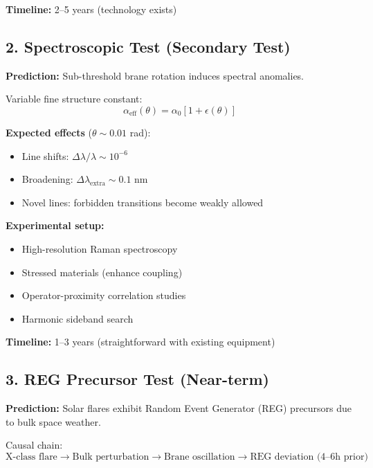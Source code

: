 \textbf{Timeline:} 2--5 years (technology exists)

\subsection{2. Spectroscopic Test (Secondary Test)}
\label{subsec:spectro-test}

\textbf{Prediction:} Sub-threshold brane rotation induces spectral anomalies.

Variable fine structure constant:
\begin{equation}
\label{eq:alpha-eff}
\alpha_{\text{eff}}(\theta) = \alpha_0[1 + \epsilon(\theta)]
\end{equation}

\textbf{Expected effects} ($\theta \sim 0.01$ rad):
\begin{itemize}
\item Line shifts: $\Delta\lambda/\lambda \sim 10^{-6}$
\item Broadening: $\Delta\lambda_{\text{extra}} \sim 0.1$ nm
\item Novel lines: forbidden transitions become weakly allowed
\end{itemize}

\textbf{Experimental setup:}
\begin{itemize}
\item High-resolution Raman spectroscopy
\item Stressed materials (enhance coupling)
\item Operator-proximity correlation studies
\item Harmonic sideband search
\end{itemize}

\textbf{Timeline:} 1--3 years (straightforward with existing equipment)

\subsection{3. REG Precursor Test (Near-term)}
\label{subsec:reg-test}

\textbf{Prediction:} Solar flares exhibit Random Event Generator (REG) precursors due to bulk space weather.

Causal chain:
\begin{equation}
\text{X-class flare} \rightarrow \text{Bulk perturbation} \rightarrow \text{Brane oscillation} \rightarrow \text{REG deviation (4--6h prior)}
\end{equation}

